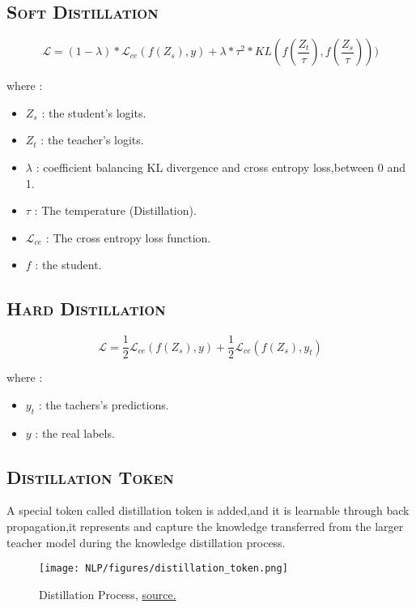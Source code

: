 \documentclass[a4paper,10pt]{article}
\begin{document}
\noindent\subsection{\scshape{Soft Distillation}}

$$
\mathcal{L} = (1 - \lambda) * \mathcal{L}_{ce}(f(Z_{s}),y) + \lambda * \tau ^ 2 * KL(f(\frac{Z_{t}}{\tau}), f(\frac{Z_{s}}{\tau})))
$$

\noindent where : 

\begin{itemize}
    \item $Z_{s}$ : the student's logits.
    \item $Z_{t}$ : the teacher's logits.
    \item $\lambda$ : coefficient balancing KL divergence and cross entropy loss,between 0 and 1.
    \item $\tau$ : The temperature (Distillation).
    \item $\mathcal{L}_{ce}$ : The cross entropy loss function.
    \item $f$ : the student.
\end{itemize}

\noindent\subsection{\scshape{Hard Distillation}}

$$
\mathcal{L} = \frac{1}{2} \mathcal{L}_{ce}(f(Z_{s}), y) + \frac{1}{2} \mathcal{L}_{ce}(f(Z_{s}), y_{t})
$$

\noindent where : 

\begin{itemize}
    \item $y_{t}$ : the tachers's predictions.
    \item $y$ : the real labels.
\end{itemize}

\noindent\subsection{\scshape{Distillation Token}}

\noindent A special token called distillation token is added,and it is learnable through back propagation,it represents and capture the knowledge transferred from the larger teacher model during the knowledge distillation process.

\begin{figure}[H]
    \centering
    \texttt{[image: NLP/figures/distillation\_token.png]}
    \caption{Distillation Process, \textcolor{blue}{\href{https://miro.medium.com/v2/resize:fit:640/format:webp/1*F-gCWtXEMsUlA10HSeQoSw.png}{source.}}}
\end{figure}
\end{document}
